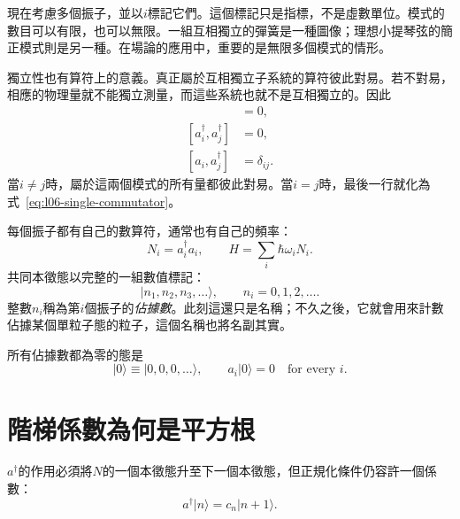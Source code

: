 現在考慮多個振子，並以\(i\)標記它們。這個標記只是指標，不是虛數單位。模式的數目可以有限，也可以無限。一組互相獨立的彈簧是一種圖像；理想小提琴弦的簡正模式則是另一種。在場論的應用中，重要的是無限多個模式的情形。

獨立性也有算符上的意義。真正屬於互相獨立子系統的算符彼此對易。若不對易，相應的物理量就不能獨立測量，而這些系統也就不是互相獨立的。因此
\begin{align}
[a_i,a_j]&=0, \\
[a_i^\dagger,a_j^\dagger]&=0, \\
[a_i,a_j^\dagger]&=\delta_{ij}.
\label{eq:l06-many-commutators}
\end{align}
當\(i\ne j\)時，屬於這兩個模式的所有量都彼此對易。當\(i=j\)時，最後一行就化為式~\eqref{eq:l06-single-commutator}。

每個振子都有自己的數算符，通常也有自己的頻率：
\begin{equation}
N_i=a_i^\dagger a_i,
\qquad
H=\sum_i\hbar\omega_i N_i.
\label{eq:l06-many-hamiltonian}
\end{equation}
共同本徵態以完整的一組數值標記：
\begin{equation}
|n_1,n_2,n_3,\ldots\rangle,
\qquad n_i=0,1,2,\ldots.
\label{eq:l06-occupation-ket}
\end{equation}
整數\(n_i\)稱為第\(i\)個振子的\emph{佔據數}。此刻這還只是名稱；不久之後，它就會用來計數佔據某個單粒子態的粒子，這個名稱也將名副其實。

所有佔據數都為零的態是
\begin{equation}
|0\rangle\equiv|0,0,0,\ldots\rangle,
\qquad a_i|0\rangle=0\quad\text{for every }i.
\label{eq:l06-oscillator-vacuum}
\end{equation}

\begin{classroomqa}
\end{classroomqa}

\section{階梯係數為何是平方根}

\(a^\dagger\)的作用必須將\(N\)的一個本徵態升至下一個本徵態，但正規化條件仍容許一個係數：
\begin{equation}
a^\dagger|n\rangle=c_n|n+1\rangle.
\label{eq:l06-unknown-coefficient}
\end{equation}

